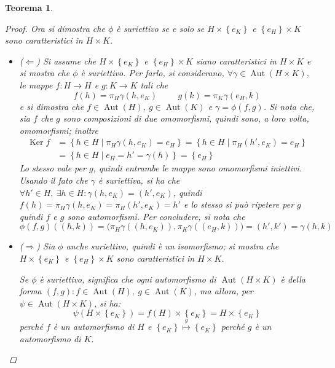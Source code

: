 \documentclass[11pt]{scrartcl}
\theoremstyle{style1}
\newtheorem{teorema}{Teorema}[section]
\numberwithin{equation}{subsection}
\begin{document}
\begin{teorema}
\begin{proof}
Ora si dimostra che $\phi $ \`e suriettivo se e solo se $H \times \left\{ e_K \right\} $ e $\left\{ e_H \right\} \times K$ sono caratteristici in $H\times K$.
\begin{itemize}
	\item ($\Leftarrow $) Si assume che $H \times \left\{ e_K \right\} $ e $\left\{ e_H \right\} \times K$ siano caratteristici in $H \times K$ e si mostra che $\phi $ \`e suriettivo.
		Per farlo, si considerano, $\forall \gamma \in  \operatorname{Aut} (H \times K)$, le mappe $f: H \to H$ e $g : K \to K $ tali che
		\[
		f(h) = \pi_H \gamma(h,e_K) \hspace{1cm} g(k) = \pi_K \gamma(e_H,k)
		\] 
		e si dimostra che $f \in \operatorname{Aut} (H), \ g\in \operatorname{Aut} (K)$ e $\gamma = \phi (f,g)$.
		Si nota che, sia $f$ che $g$ sono composizioni di due omomorfismi, quindi sono, a loro volta, omomorfismi; inoltre
		\[
		\begin{split}
				\operatorname{Ker} f &= \left\{ h \in H  \mid \pi _H \gamma(h,e_K) = e_H \right\} = \left\{ h \in H  \mid \pi_H ( h', e_K) = e_H \right\} \\
						     &= \left\{ h \in H  \mid e_H = h'= \gamma(h) \right\} = \left\{ e_H \right\} 
		\end{split}
		\] 
	Lo stesso vale per $g$, quindi entrambe le mappe sono omomorfismi iniettivi.
	Usando il fato che $\gamma$ \`e suriettiva, si ha che $\forall h' \in  H , \ \exists h \in H : \gamma(h,e_K) = (h',e_K)$, quindi $f(h) = \pi_H \gamma(h,e_K) = \pi_H(h',e_K) = h'$ e lo stesso si pu\`o ripetere per $g$ quindi $f$ e $g$ sono automorfismi.
	Per concludere, si nota che
	\[
	\phi (f,g)((h,k)) = \big(\pi_H \gamma((h,e_K)),\pi_K \gamma((e_H,k))\big) = (h',k') = \gamma(h,k)
	\] 
\item ($\Rightarrow $) Sia $\phi $ anche suriettivo, quindi \`e un isomorfismo; si mostra che $H \times \left\{ e_K \right\} $ e $\left\{ e_ H\right\}  \times  K$ sono caratteristici in $H \times K$.

	Se $\phi  $ \`e suriettivo, significa che ogni automorfismo di $\operatorname{Aut} (H \times K) $ \`e della forma $(f,g) : f \in \operatorname{Aut} (H) , \ g \in \operatorname{Aut} (K)$, ma allora, per $\psi  \in  \operatorname{Aut}(H \times K )$, si ha:
	\[
	\psi (H \times \left\{ e_K \right\} ) = f(H) \times \left\{ e_K \right\} = H \times \left\{ e_K \right\} 
	\] 
	perch\'e $f$ \`e un automorfismo di $H$ e $\left\{ e_K \right\} \stackrel{g}{\longmapsto} \left\{ e_K \right\} $ perch\'e $g$ \`e un automorfismo di $K$.
\end{itemize}
	\end{proof}
\end{teorema}
\end{document}
